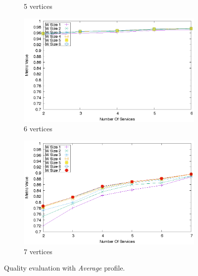 \begin{figure}[ht]
\begin{subfigure}{0.33\textwidth}
    \caption{5 vertices}
    \label{fig:third}
  \end{subfigure}
  \hfill
  \begin{subfigure}{0.33\textwidth}
    \includegraphics[width=\textwidth]{Images/graphs/quality_plot_good_n6.eps}
    \caption{6 vertices}
    \label{fig:third}
  \end{subfigure}
  \hfill
  \begin{subfigure}{0.33\textwidth}
    \includegraphics[width=\textwidth]{Images/graphs/quality_plot_vbad_n7.eps}
    \caption{7 vertices}
    \label{fig:third}
  \end{subfigure}
  \caption{Quality evaluation with \textit{Average} profile.}
  \label{fig:quality_window_average}
\end{figure}


